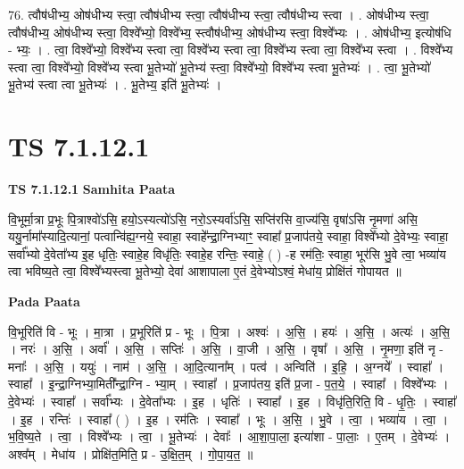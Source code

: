\documentclass[17pt]{extarticle}
\begin{document}
76. त्वौष॑धीभ्य॒ ओष॑धीभ्य स्त्वा॒ त्वौष॑धीभ्य स्त्वा॒ त्वौष॑धीभ्य स्त्वा॒ त्वौष॑धीभ्य स्त्वा । . ओष॑धीभ्य स्त्वा॒ त्वौष॑धीभ्य॒ ओष॑धीभ्य स्त्वा॒ विश्वे᳚भ्यो॒ विश्वे᳚भ्य॒ स्त्वौष॑धीभ्य॒ ओष॑धीभ्य स्त्वा॒ विश्वे᳚भ्यः । . ओष॑धीभ्य॒ इत्योष॑धि - भ्यः॒ । . त्वा॒ विश्वे᳚भ्यो॒ विश्वे᳚भ्य स्त्वा त्वा॒ विश्वे᳚भ्य स्त्वा त्वा॒ विश्वे᳚भ्य स्त्वा त्वा॒ विश्वे᳚भ्य स्त्वा । . विश्वे᳚भ्य स्त्वा त्वा॒ विश्वे᳚भ्यो॒ विश्वे᳚भ्य स्त्वा भू॒तेभ्यो॑ भू॒तेभ्य॑ स्त्वा॒ विश्वे᳚भ्यो॒ विश्वे᳚भ्य स्त्वा भू॒तेभ्यः॑ । . त्वा॒ भू॒तेभ्यो॑ भू॒तेभ्य॑ स्त्वा त्वा भू॒तेभ्यः॑ । . भू॒तेभ्य॒ इति॑ भू॒तेभ्यः॑ । \newline
\pagebreak
{}

\section{ TS 7.1.12.1 }

\textbf{TS 7.1.12.1 } \newline
\textbf{Samhita Paata} \newline

वि॒भूर्मा॒त्रा प्र॒भूः पि॒त्राश्वो॑ऽसि॒ हयो॒ऽस्यत्यो॑ऽसि॒ नरो॒ऽस्यर्वा॑ऽसि॒ सप्ति॑रसि वा॒ज्य॑सि॒ वृषा॑ऽसि नृ॒मणा॑ असि॒ ययु॒र्नामा᳚स्यादि॒त्यानां॒ पत्वान्वि॑ह्य॒ग्नये॒ स्वाहा॒ स्वाहे᳚न्द्रा॒ग्निभ्याꣳ॒॒ स्वाहा᳚ प्र॒जाप॑तये॒ स्वाहा॒ विश्वे᳚भ्यो दे॒वेभ्यः॒ स्वाहा॒ सर्वा᳚भ्यो दे॒वेता᳚भ्य इ॒ह धृतिः॒ स्वाहे॒ह विधृ॑तिः॒ स्वाहे॒ह रन्तिः॒ स्वाहे॒ ( ) -ह रम॑तिः॒ स्वाहा॒ भूर॑सि भु॒वे त्वा॒ भव्या॑य त्वा भविष्य॒ते त्वा॒ विश्वे᳚भ्यस्त्वा भू॒तेभ्यो॒ देवा॑ आशापाला ए॒तं दे॒वेभ्योऽश्वं॒ मेधा॑य॒ प्रोक्षि॑तं गोपायत ॥ \newline

\textbf{Pada Paata} \newline

वि॒भूरिति॑ वि - भूः । मा॒त्रा । प्र॒भूरिति॑ प्र - भूः । पि॒त्रा । अश्वः॑ । अ॒सि॒ । हयः॑ । अ॒सि॒ । अत्यः॑ । अ॒सि॒ । नरः॑ । अ॒सि॒ । अर्वा᳚ । अ॒सि॒ । सप्तिः॑ । अ॒सि॒ । वा॒जी । अ॒सि॒ । वृषा᳚ । अ॒सि॒ । नृ॒मणा॒ इति॑ नृ - मनाः᳚ । अ॒सि॒ । ययुः॑ । नाम॑ । अ॒सि॒ । आ॒दि॒त्याना᳚म् । पत्व॑ । अन्विति॑ । इ॒हि॒ । अ॒ग्नये᳚ । स्वाहा᳚ । स्वाहा᳚ । इ॒न्द्रा॒ग्निभ्या॒मिती᳚न्द्रा॒ग्नि - भ्या॒म् । स्वाहा᳚ । प्र॒जाप॑तय॒ इति॑ प्र॒जा - प॒त॒ये॒ । स्वाहा᳚ । विश्वे᳚भ्यः । दे॒वेभ्यः॑ । स्वाहा᳚ । सर्वा᳚भ्यः । दे॒वेता᳚भ्यः । इ॒ह । धृतिः॑ । स्वाहा᳚ । इ॒ह । विधृ॑ति॒रिति॒ वि - धृ॒तिः॒ । स्वाहा᳚ । इ॒ह । रन्तिः॑ । स्वाहा᳚ ( ) । इ॒ह । रम॑तिः । स्वाहा᳚ । भूः । अ॒सि॒ । भु॒वे । त्वा॒ । भव्या॑य । त्वा॒ । भ॒वि॒ष्य॒ते । त्वा॒ । विश्वे᳚भ्यः । त्वा॒ । भू॒तेभ्यः॑ । देवाः᳚ । आ॒शा॒पा॒ला॒ इत्या॑शा - पा॒लाः॒ । ए॒तम् । दे॒वेभ्यः॑ । अश्व᳚म् । मेधा॑य । प्रोक्षि॑त॒मिति॒ प्र - उ॒क्षि॒त॒म् । गो॒पा॒य॒त॒ ॥  \newline
\end{document}
